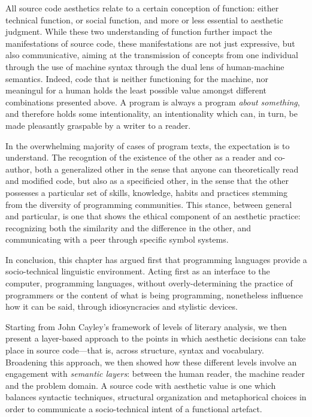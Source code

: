 All source code aesthetics relate to a certain conception of function: either technical function, or social function, and more or less essential to aesthetic judgment. While these two understanding of function further impact the manifestations of source code, these manifestations are not just expressive, but also communicative, aiming at the transmission of concepts from one individual through the use of machine syntax through the dual lens of human-machine semantics. Indeed, code that is neither functioning for the machine, nor meaningul for a human holds the least possible value amongst different combinations presented above. A program is always a program \emph{about something}, and therefore holds some intentionality, an intentionality which can, in turn, be made pleasantly graspable by a writer to a reader.

In the overwhelming majority of cases of program texts, the expectation is to understand. The recogntion of the existence of the other as a reader and co-author, both a generalized other in the sense that anyone can theoretically read and modified code, but also as a specificied other, in the sense that the other possesses a particular set of skills, knowledge, habits and practices stemming from the diversity of programming communities. This stance, between general and particular, is one that shows the ethical component of an aesthetic practice: recognizing both the similarity and the difference in the other, and communicating with a peer through specific symbol systems.

\spacer

In conclusion, this chapter has argued first that programming languages provide a socio-technical linguistic environment. Acting first as an interface to the computer, programming languages, without overly-determining the practice of programmers or the content of what is being programming, nonetheless influence how it can be said, through idiosyncracies and stylistic devices.

Starting from John Cayley's framework of levels of literary analysis, we then present a layer-based approach to the points in which aesthetic decisions can take place in source code—that is, across structure, syntax and vocabulary. Broadening this approach, we then showed how these different levels involve an engagement with \emph{semantic layers}: between the human reader, the machine reader and the problem domain. A source code with aesthetic value is one which balances syntactic techniques, structural organization and metaphorical choices in order to communicate a socio-technical intent of a functional artefact.

